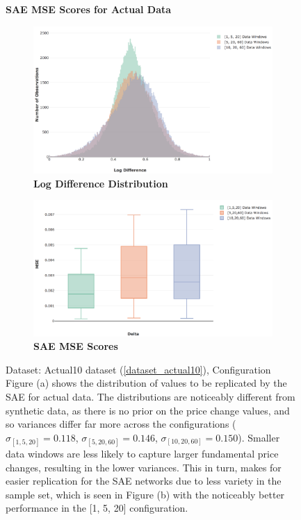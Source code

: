 \documentclass[a4paper,11pt,oneside]{article}
\theoremstyle{plain}
\theoremstyle{definition}
\begin{document}
\begin{figure}[H]
	\centering
	\textbf{SAE MSE Scores for Actual Data}
	\begin{subfigure}{.5\textwidth}
		\centering 
		\includegraphics[scale=0.25]{images/results/data/actual_aggregate_dist.png}
		\caption{\textbf{Log Difference Distribution}
			\newline }
		\label{figure-actual_aggregate_dist}
	\end{subfigure}%
	\begin{subfigure}{.5\textwidth}
		\centering 
		\includegraphics[scale=0.26]{images/results/data/actual_aggregation_mse.png}
		\caption{\textbf{SAE MSE Scores} 
			\newline }
		\label{figure-actual_aggregation_mse}
	\end{subfigure}
	\caption{Dataset: Actual10 dataset (\ref{dataset_actual10}), Configuration 
		\newline Figure (a) shows the distribution of values to be replicated by the SAE for actual data. The distributions are noticeably different from synthetic data, as there is no prior on the price change values, and so variances differ far more across the configurations ($\sigma_{[1,5,20]} = 0.118$, $\sigma_{[5,20,60]} = 0.146$, $\sigma_{[10,20,60]} = 0.150$). Smaller data windows are less likely to capture larger fundamental price changes, resulting in the lower variances. This in turn, makes for easier replication for the SAE networks due to less variety in the sample set, which is seen in Figure (b) with the noticeably better performance in the [1, 5, 20] configuration.   }
	\label{fig:data_sae_actual}
\end{figure}
\end{document}
